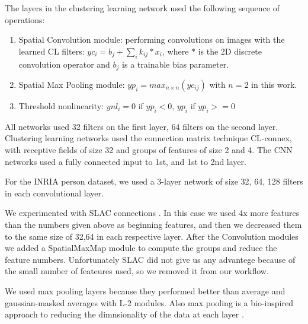 \documentclass{article} %
\begin{document}
The layers in the clustering learning network used the following sequence of operations:
\begin{enumerate}
\item Spatial Convolution module: performing convolutions on images with the learned CL filters: $yc_i=b_j+\sum_i{k_{ij}\ast x_i}$, where $\ast$ is the 2D discrete convolution operator and $b_j$ is a trainable bias parameter.
\item Spatial Max Pooling module: $yp_i = max_{n \times n}(yc_{ij})$ with $n =  2$ in this work.
\item Threshold nonlinearity: $ynl_i = 0$ if $yp_i < 0$, $yp_i$ if $yp_i >= 0$
\end{enumerate}


All networks used 32 filters on the first layer, 64 filters on the second layer. Clustering learning networks used the connection matrix technique CL-connex, with receptive fields of size 32 and groups of features of size 2 and 4. The CNN networks used a fully connected input to 1st, and 1st to 2nd layer. 

For the INRIA person dataset, we used a 3-layer network of size 32, 64, 128 filters in each convolutional layer.

We experimented with SLAC connections \cite{coates2012emergence}. In this case we used 4x more features than the numbers given above as beginning features, and then we decreased them to the same size of 32,64 in each respective layer. After the Convolution modules we added a SpatialMaxMap module to compute the groups and reduce the feature numbers. Unfortunately SLAC did not give us any advantege because of the small number of feateures used, so we removed it from our workflow.

We used max pooling layers because they performed better than average and gaussian-masked averages with L-2 modules. Also max pooling is a bio-inspired approach to reducing the dimnsionality of the data at each layer \cite{lampl2004intracellular}.
\end{document}
